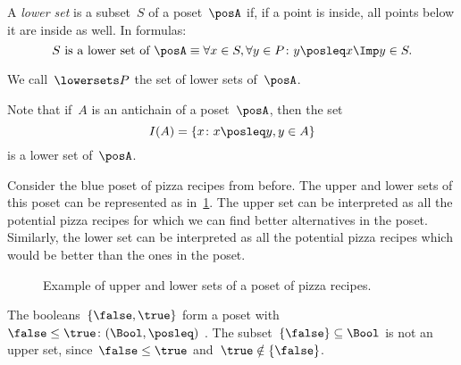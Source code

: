 \begin{definition}
  \label{def:lowerset}
  A \emph{lower set} is a subset~$S$ of a poset~$\posA$ if, if a point is inside, all points below it are inside as well. In formulas:
  \begin{equation}
    \text{$S$ is a lower set of $\posA$} \equiv \forall x\in S, \forall y\in P\colon y\posleq x \Imp y\in S.
  \end{equation}
\end{definition}
\begin{remark}
  We call~$\lowersets P$ the set of lower sets of~$\posA$.
\end{remark}

\begin{remark}
  Note that if~$A$ is an antichain of a poset~$\posA$, then the set
  \begin{equation}
    I(A)=\{x\colon x\posleq y, y\in A\}
  \end{equation}
  is a lower set of~$\posA$.
\end{remark}

Consider the blue poset of pizza recipes from before. The upper and lower sets of this poset can be represented as in~\cref{fig:upperset}. The upper set can be interpreted as all the potential pizza recipes for which we can find better alternatives in the poset. Similarly, the lower set can be interpreted as all the potential pizza recipes which would be better than the ones in the poset.

\begin{figure}[h!]
  \begin{center}
  \end{center}
  \caption{Example of upper and lower sets of a poset of pizza recipes.}
   \label{fig:upperset}
\end{figure}
\begin{example}
  The booleans~$\{\false, \true \}$ form a poset with~$\false \leq \true\colon(\Bool,\posleq)$ . The subset~$\{\false\} \subseteq \Bool$ is not an upper set, since~$\false \leq \true$ and~$\true \notin \{\false \}$.
\end{example}



